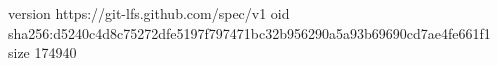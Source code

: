 version https://git-lfs.github.com/spec/v1
oid sha256:d5240c4d8c75272dfe5197f797471bc32b956290a5a93b69690cd7ae4fe661f1
size 174940
